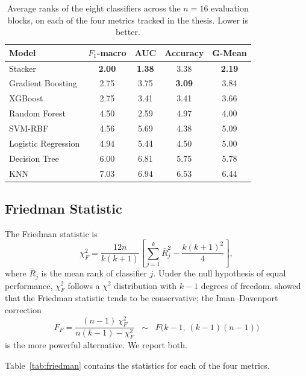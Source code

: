 \begin{table}[H]
\centering
\caption{Average ranks of the eight classifiers across the
$n=16$ evaluation blocks, on each of the four metrics tracked
in the thesis. Lower is better.}
\singlespacing
\label{tab:mean-ranks}
\small
\renewcommand{\arraystretch}{1.15}
\begin{tabular}{l c c c c}
\toprule
\textbf{Model} & \textbf{$F_1$-macro} & \textbf{AUC} & \textbf{Accuracy} & \textbf{G-Mean}\\
\midrule
Stacker & \textbf{2.00} & \textbf{1.38} & 3.38 & \textbf{2.19}\\
Gradient Boosting & 2.75 & 3.75 & \textbf{3.09} & 3.84\\
XGBoost & 2.75 & 3.41 & 3.41 & 3.66\\
Random Forest & 4.50 & 2.59 & 4.97 & 4.00\\
SVM-RBF & 4.56 & 5.69 & 4.38 & 5.09\\
Logistic Regression & 4.94 & 5.44 & 4.50 & 5.00\\
Decision Tree & 6.00 & 6.81 & 5.75 & 5.78\\
KNN & 7.03 & 6.94 & 6.53 & 6.44\\
\bottomrule
\end{tabular}
\end{table}
\subsection{Friedman Statistic}

The Friedman statistic is
\begin{equation}
\chi^{2}_{F}
=
\frac{12n}{k(k+1)}
\left[
\sum_{j=1}^{k} \bar R_{j}^{2}
-
\frac{k(k+1)^{2}}{4}
\right],
\tag{5.1}
\label{eq:friedman}
\end{equation}
where $\bar R_j$ is the mean rank of classifier $j$. Under the
null hypothesis of equal performance, $\chi^{2}_{F}$ follows a
$\chi^{2}$ distribution with $k-1$ degrees of freedom.
\citet{iman1980approximations} showed that the Friedman statistic
tends to be conservative; the Iman--Davenport correction
\begin{equation}
F_{F}
=
\frac{(n-1)\,\chi^{2}_{F}}{n(k-1)-\chi^{2}_{F}}
\;\;\sim\;\;
F\bigl(k-1,\,(k-1)(n-1)\bigr)
\tag{5.2}
\label{eq:imandav}
\end{equation}
is the more powerful alternative. We report both.

Table~\ref{tab:friedman} contains the statistics for each of the
four metrics.

